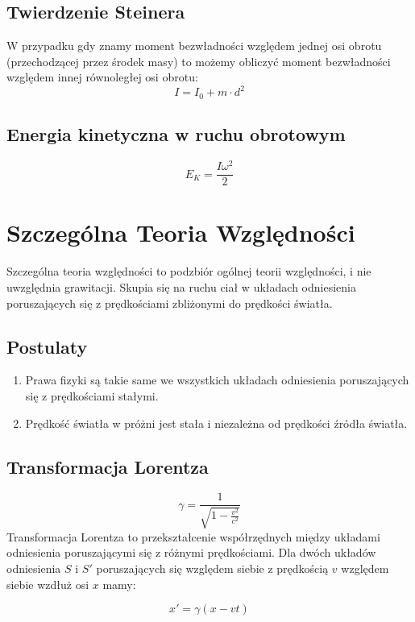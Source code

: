 \documentclass{../notatki}
\begin{document}
\subsection{Twierdzenie Steinera}

W przypadku gdy znamy moment bezwładności względem jednej osi obrotu
(przechodzącej przez środek masy) to możemy obliczyć moment bezwładności
względem innej równoległej osi obrotu:
$$
I = I_0 + m \cdot d^2
$$

\subsection{Energia kinetyczna w ruchu obrotowym}

$$
E_K = \frac{I\omega^2}{2}
$$

\section{Szczególna Teoria Względności}

Szczególna teoria względności to podzbiór ogólnej teorii względności, i nie
uwzględnia grawitacji. Skupia się na ruchu ciał w układach odniesienia
poruszających się z prędkościami zbliżonymi do prędkości światła.

\subsection{Postulaty}

\begin{enumerate}
  \item Prawa fizyki są takie same we wszystkich układach odniesienia
    poruszających się z prędkościami stałymi.
  \item Prędkość światła w próżni jest stała i niezależna od prędkości
    źródła światła.
\end{enumerate}

\subsection{Transformacja Lorentza}

$$
\gamma = \frac{1}{\sqrt{1 - \frac{v^2}{c^2}}}
$$
Transformacja Lorentza to przekształcenie współrzędnych między układami
odniesienia poruszającymi się z różnymi prędkościami. Dla dwóch układów
odniesienia $S$ i $S'$ poruszających się względem siebie z prędkością $v$
względem siebie wzdłuż osi $x$ mamy:

$$
x' = \gamma(x - vt)
$$
\end{document}
